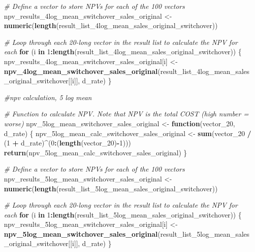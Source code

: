\documentclass[
]{article}
\newenvironment{Shaded}{\begin{snugshade}}{\end{snugshade}}
\newcommand{\CommentTok}[1]{\textcolor[rgb]{0.56,0.35,0.01}{\textit{#1}}}
\newcommand{\ControlFlowTok}[1]{\textcolor[rgb]{0.13,0.29,0.53}{\textbf{#1}}}
\newcommand{\DecValTok}[1]{\textcolor[rgb]{0.00,0.00,0.81}{#1}}
\newcommand{\FunctionTok}[1]{\textcolor[rgb]{0.13,0.29,0.53}{\textbf{#1}}}
\newcommand{\NormalTok}[1]{#1}
\newcommand{\OtherTok}[1]{\textcolor[rgb]{0.56,0.35,0.01}{#1}}
\newcommand{\SpecialCharTok}[1]{\textcolor[rgb]{0.81,0.36,0.00}{\textbf{#1}}}
\begin{document}
\begin{Shaded}
\begin{Highlighting}[]
\CommentTok{\# Define a vector to store NPVs for each of the 100 vectors}
\NormalTok{npv\_results\_4log\_mean\_switchover\_sales\_original }\OtherTok{\textless{}{-}} \FunctionTok{numeric}\NormalTok{(}\FunctionTok{length}\NormalTok{(result\_list\_4log\_mean\_sales\_original\_switchover))}

\CommentTok{\# Loop through each 20{-}long vector in the result list to calculate the NPV for each}
\ControlFlowTok{for}\NormalTok{ (i }\ControlFlowTok{in} \DecValTok{1}\SpecialCharTok{:}\FunctionTok{length}\NormalTok{(result\_list\_4log\_mean\_sales\_original\_switchover)) \{}
\NormalTok{  npv\_results\_4log\_mean\_switchover\_sales\_original[i] }\OtherTok{\textless{}{-}} \FunctionTok{npv\_4log\_mean\_switchover\_sales\_original}\NormalTok{(result\_list\_4log\_mean\_sales\_original\_switchover[[i]], d\_rate)}
\NormalTok{\}}


\CommentTok{\#npv calculation, 5 log mean}


\CommentTok{\# Function to calculate NPV. Note that NPV is the total COST (high number = worse)}
\NormalTok{npv\_5log\_mean\_switchover\_sales\_original }\OtherTok{\textless{}{-}} \ControlFlowTok{function}\NormalTok{(vector\_20, d\_rate) \{}
\NormalTok{  npv\_5log\_mean\_calc\_switchover\_sales\_original }\OtherTok{\textless{}{-}} \FunctionTok{sum}\NormalTok{(vector\_20 }\SpecialCharTok{/}\NormalTok{ (}\DecValTok{1} \SpecialCharTok{+}\NormalTok{ d\_rate)}\SpecialCharTok{\^{}}\NormalTok{(}\DecValTok{0}\SpecialCharTok{:}\NormalTok{(}\FunctionTok{length}\NormalTok{(vector\_20)}\SpecialCharTok{{-}}\DecValTok{1}\NormalTok{)))}
  \FunctionTok{return}\NormalTok{(npv\_5log\_mean\_calc\_switchover\_sales\_original)}
\NormalTok{\}}

\CommentTok{\# Define a vector to store NPVs for each of the 100 vectors}
\NormalTok{npv\_results\_5log\_mean\_switchover\_sales\_original }\OtherTok{\textless{}{-}} \FunctionTok{numeric}\NormalTok{(}\FunctionTok{length}\NormalTok{(result\_list\_5log\_mean\_sales\_original\_switchover))}

\CommentTok{\# Loop through each 20{-}long vector in the result list to calculate the NPV for each}
\ControlFlowTok{for}\NormalTok{ (i }\ControlFlowTok{in} \DecValTok{1}\SpecialCharTok{:}\FunctionTok{length}\NormalTok{(result\_list\_5log\_mean\_sales\_original\_switchover)) \{}
\NormalTok{  npv\_results\_5log\_mean\_switchover\_sales\_original[i] }\OtherTok{\textless{}{-}} \FunctionTok{npv\_5log\_mean\_switchover\_sales\_original}\NormalTok{(result\_list\_5log\_mean\_sales\_original\_switchover[[i]], d\_rate)}
\NormalTok{\}}



\end{Highlighting}
\end{Shaded}
\end{document}
